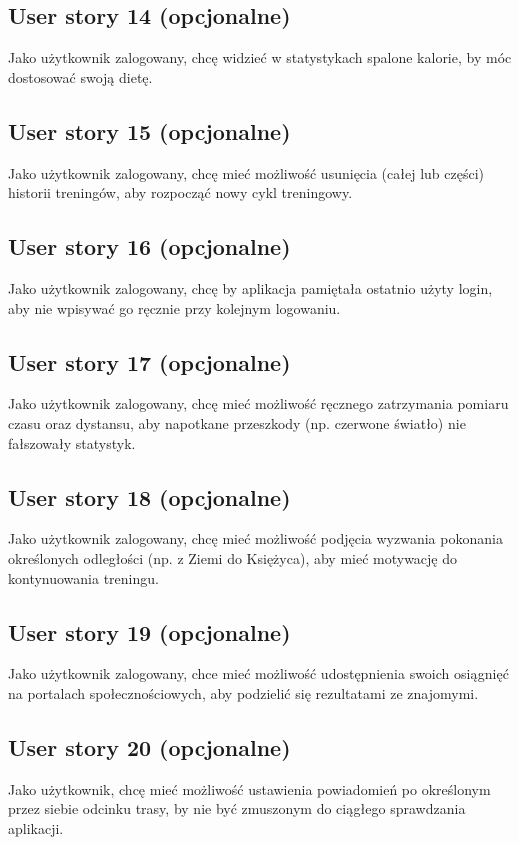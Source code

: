 \documentclass[a4paper]{article}
\begin{document}
\subsection{User story 14 (opcjonalne)}
Jako użytkownik zalogowany, chcę widzieć w statystykach spalone kalorie, by móc dostosować swoją dietę.

\subsection{User story 15 (opcjonalne)}
Jako użytkownik zalogowany, chcę mieć możliwość usunięcia (całej lub części) historii treningów, aby rozpocząć nowy cykl treningowy.

\subsection{User story 16 (opcjonalne)}
Jako użytkownik zalogowany, chcę by aplikacja pamiętała ostatnio użyty login, aby nie wpisywać go ręcznie przy kolejnym logowaniu.

\subsection{User story 17 (opcjonalne)}
Jako użytkownik zalogowany, chcę mieć możliwość ręcznego zatrzymania pomiaru czasu oraz dystansu, aby napotkane przeszkody (np. czerwone światło) nie fałszowały statystyk.

\subsection{User story 18 (opcjonalne)}
Jako użytkownik zalogowany, chcę mieć możliwość podjęcia wyzwania pokonania określonych odległości (np. z Ziemi do Księżyca), aby mieć motywację do kontynuowania treningu.

\subsection{User story 19 (opcjonalne)}
Jako użytkownik zalogowany, chce mieć możliwość udostępnienia swoich osiągnięć na portalach społecznościowych, aby podzielić się rezultatami ze znajomymi.

\subsection{User story 20 (opcjonalne)}
Jako użytkownik, chcę mieć możliwość ustawienia powiadomień po określonym przez siebie odcinku trasy, by nie być zmuszonym do ciągłego sprawdzania aplikacji.
\end{document}
